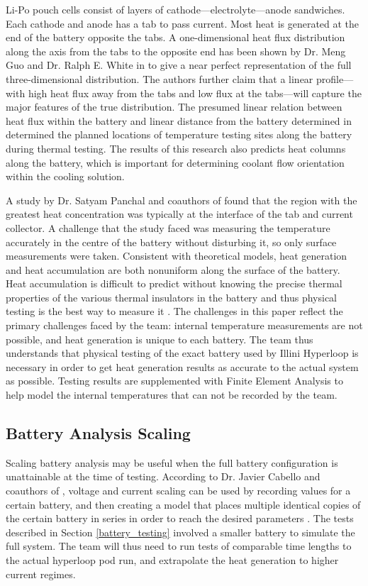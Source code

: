 \documentclass[11pt]{article}
\numberwithin{equation}{subsection} %
\begin{document}
Li-Po pouch cells consist of layers of cathode---electrolyte---anode sandwiches. Each cathode and anode has a tab to pass current. Most heat is generated at the end of the battery opposite the tabs. A one-dimensional heat flux distribution along the axis from the tabs to the opposite end has been shown by Dr. Meng Guo and Dr. Ralph E. White in \cite{distribution} to give a near perfect representation of the full three-dimensional distribution. The authors further claim that a linear profile---with high heat flux away from the tabs and low flux at the tabs---will capture the major features of the true distribution. The presumed linear relation between heat flux within the battery and linear distance from the battery determined in \cite{distribution} determined the planned locations of temperature testing sites along the battery during thermal testing. The results of this research also predicts heat columns along the battery, which is important for determining coolant flow orientation within the cooling solution.

A study by Dr. Satyam Panchal and coauthors of \cite{SAE} found that the region with the greatest heat concentration was typically at the interface of the tab and current collector. A challenge that the study faced was measuring the temperature accurately in the centre of the battery without disturbing it, so only surface measurements were taken. Consistent with theoretical models, heat generation and heat accumulation are both nonuniform along the surface of the battery. Heat accumulation is difficult to predict without knowing the precise thermal properties of the various thermal insulators in the battery and thus physical testing is the best way to measure it \cite{SAE}. The challenges in this paper reflect the primary challenges faced by the team: internal temperature measurements are not possible, and heat generation is unique to each battery. The team thus understands that physical testing of the exact battery used by Illini Hyperloop is necessary in order to get heat generation results as accurate to the actual system as possible. Testing results are supplemented with Finite Element Analysis to help model the internal temperatures that can not be recorded by the team.

\subsection{Battery Analysis Scaling}
Scaling battery analysis may be useful when the full battery configuration is unattainable at the time of testing. According to Dr. Javier Cabello and coauthors of \cite{scaling}, voltage and current scaling can be used by recording values for a certain battery, and then creating a model that places multiple identical copies of the certain battery in series in order to reach the desired parameters \cite{scaling}. The tests described in Section \ref{battery_testing} involved a smaller battery to simulate the full system. The team will thus need to run tests of comparable time lengths to the actual hyperloop pod run, and extrapolate the heat generation to higher current regimes.
\end{document}
